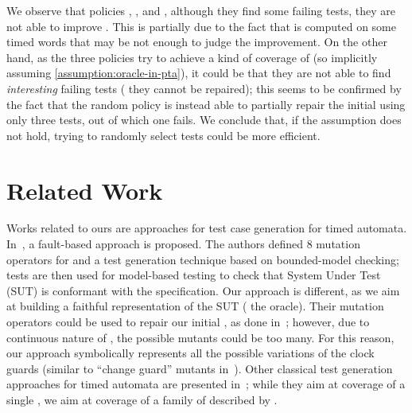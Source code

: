 \begin{tikzborder}{\cite{Gargantini16:validation}}
\begin{tikzborder}{\cite{gargantini_combinatorial_2017}}
\begin{tikzborder}{\cite{gargantini_combinatorial_2017}}
\begin{tikzborder}{\cite{garn2019}}
\begin{tikzborder}{\cite{arcaini2019achieving}}
\begin{tikzborder}{\cite{arcaini2019varivolution}}
\begin{tikzborder}{}
We observe that policies \policyminusplus, \policymiddle, and \policyquarter, although they find some failing tests, they are not able to improve \semConf. This is partially due to the fact that \semConf is computed on some timed words \testDataConf that may be not enough to judge the improvement. On the other hand, as the three policies try to achieve a kind of coverage of \ptaProc (so implicitly assuming \ref{assumption:oracle-in-pta}), it could be that they are not able to find {\it interesting} failing tests (\ie{} they cannot be repaired); this seems to be confirmed by the fact that the random policy \policyrand is instead able to partially repair the initial \ta using only three tests, out of which one fails. We conclude that, if the assumption does not hold, trying to randomly select tests could be more efficient.
\end{tikzborder}

\section{Related Work}\label{sec:related1}

\bb Works related to ours are approaches for test case generation for timed automata. In~\cite{aichernig2013time,aichernig2014debugging}, a fault-based approach is proposed. The authors defined 8 mutation operators for \tas and a test generation technique based on bounded-model checking; tests are then used for model-based testing to check that System Under Test (SUT) is conformant with the specification. Our approach is different, as we aim at building a faithful representation of the SUT (\ie{} the oracle). Their mutation operators could be used to repair our initial \ta, as done in~\cite{arcaini2019achieving}; however, due to continuous nature of \tas, the possible mutants could be too many. For this reason, our approach symbolically represents all the possible variations of the clock guards (similar to ``change guard'' mutants in~\cite{aichernig2013time}). Other classical test generation approaches for timed automata are presented in~\cite{springintveld2001testing,Hessel2008}; while they aim at coverage of a single \ta, we aim at coverage of a family of \tas described by \ptaProc.




\end{tikzborder}
\end{tikzborder}
\end{tikzborder}
\end{tikzborder}
\end{tikzborder}
\end{tikzborder}
